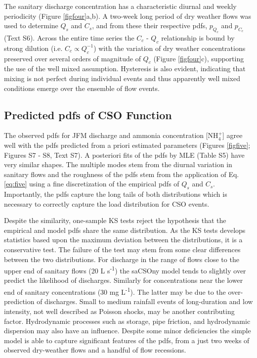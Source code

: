 \documentclass{agujournal2018}
\begin{document}
The sanitary discharge concentration has a characteristic diurnal and weekly periodicity (Figure \ref{figfour}a,b). A two-week long period of dry weather f\/lows was used to determine $Q_s$ and $C_s$, and from these their respective pdfs, $p_{Q_c}$ and $p_{C_c}$ (Text S6).  Across the entire time series the $C_c$ - $Q_c$ relationship is bound by strong dilution (i.e. $C_c \propto Q_c^{-1}$) with the variation of dry weather concentrations preserved over several orders of magnitude of $Q_c$ (Figure \ref{figfour}c), supporting the use of the well mixed assumption. Hysteresis is also evident, indicating that mixing is not perfect during individual events and thus apparently well mixed conditions emerge over the ensemble of flow events.

\subsection{Predicted pdfs of CSO Function}
The observed pdfs for JFM discharge and ammonia concentration [NH$_4^+$] agree well with the pdfs predicted from a priori estimated parameters (Figures \ref{figfive}; Figures S7 - S8, Text S7). A posteriori fits of the pdfs by MLE (Table S5) have very similar shapes. The multiple modes stem from the diurnal variation in sanitary f\/lows and the roughness of the pdfs stem from the application of Eq. \ref{eq:five} using a fine discretization of the empirical pdfs of $Q_s$ and $C_s$.  Importantly, the pdfs capture the long tails of both distributions which is necessary to correctly capture the load distribution for CSO events. 
 
Despite the similarity, one-sample KS tests reject the hypothesis that the empirical and model pdfs share the same distribution. As the KS tests develops statistics based upon the maximum deviation between the distributions, it is a conservative test. The failure of the test may stem from some clear dif\/ferences between the two distributions. For discharge in the range of f\/lows close to the upper end of sanitary f\/lows (20 L s\textsuperscript{-1}) the saCSOny model tends to slightly over predict the likelihood of discharges. Similarly for concentrations near the lower end of sanitary concentrations (30 mg L\textsuperscript{-1}). The latter may be due to the over-prediction of discharges. Small to medium rainfall events of long-duration and low intensity, not well described as Poisson shocks, may be another contributing factor. Hydrodynamic processes such as storage, pipe friction, and hydrodynamic dispersion may also have an inf\/luence. Despite some minor def\/iciencies the simple model is able to capture signif\/icant features of the pdfs, from a just two weeks of observed dry-weather f\/lows and a handful of f\/low recessions.
 
\end{document}

